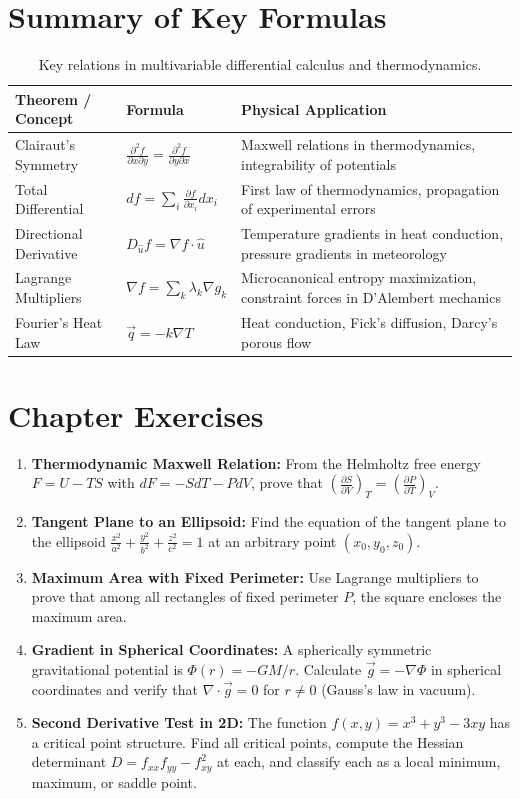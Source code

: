 \section{Summary of Key Formulas}
\begin{table}[H]
\centering
\small
\begin{tabularx}{\textwidth}{llX}
\toprule
\textbf{Theorem / Concept} & \textbf{Formula} & \textbf{Physical Application} \\
\midrule
Clairaut's Symmetry & $\frac{\partial^2 f}{\partial x \partial y} = \frac{\partial^2 f}{\partial y \partial x}$ & Maxwell relations in thermodynamics, integrability of potentials \\
Total Differential & $df = \sum_i \frac{\partial f}{\partial x_i}dx_i$ & First law of thermodynamics, propagation of experimental errors \\
Directional Derivative & $D_{\hat{u}} f = \nabla f \cdot \hat{u}$ & Temperature gradients in heat conduction, pressure gradients in meteorology \\
Lagrange Multipliers & $\nabla f = \sum_k \lambda_k \nabla g_k$ & Microcanonical entropy maximization, constraint forces in D'Alembert mechanics \\
Fourier's Heat Law & $\vec{q} = -k\nabla T$ & Heat conduction, Fick's diffusion, Darcy's porous flow \\
\bottomrule
\end{tabularx}
\caption{Key relations in multivariable differential calculus and thermodynamics.}
\label{tab:ch06_summary}
\end{table}

\section{Chapter Exercises}
\begin{enumerate}
    \item \textbf{Thermodynamic Maxwell Relation:} From the Helmholtz free energy $F = U - TS$ with $dF = -SdT - PdV$, prove that $\left(\frac{\partial S}{\partial V}\right)_T = \left(\frac{\partial P}{\partial T}\right)_V$.
    \item \textbf{Tangent Plane to an Ellipsoid:} Find the equation of the tangent plane to the ellipsoid $\frac{x^2}{a^2} + \frac{y^2}{b^2} + \frac{z^2}{c^2} = 1$ at an arbitrary point $(x_0, y_0, z_0)$.
    \item \textbf{Maximum Area with Fixed Perimeter:} Use Lagrange multipliers to prove that among all rectangles of fixed perimeter $P$, the square encloses the maximum area.
    \item \textbf{Gradient in Spherical Coordinates:} A spherically symmetric gravitational potential is $\Phi(r) = -GM/r$. Calculate $\vec{g} = -\nabla\Phi$ in spherical coordinates and verify that $\nabla \cdot \vec{g} = 0$ for $r \neq 0$ (Gauss's law in vacuum).
    \item \textbf{Second Derivative Test in 2D:} The function $f(x,y) = x^3 + y^3 - 3xy$ has a critical point structure. Find all critical points, compute the Hessian determinant $D = f_{xx}f_{yy} - f_{xy}^2$ at each, and classify each as a local minimum, maximum, or saddle point.
\end{enumerate}
